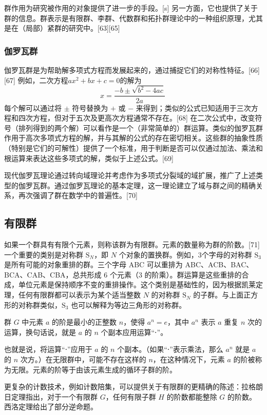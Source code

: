 群作用为研究被作用的对象提供了进一步的手段。[s] 另一方面，它也提供了关于群的信息。群表示是有限群、李群、代数群和拓扑群理论中的一种组织原理，尤其是在（局部）紧群的研究中。[63][65]
\subsubsection{伽罗瓦群}   
伽罗瓦群是为帮助解多项式方程而发展起来的，通过捕捉它们的对称性特征。[66][67] 例如，二次方程\(ax^2 + bx + c = 0\)的解为  
\[x = \frac{-b \pm \sqrt{b^2 - 4ac}}{2a}~\]
每个解可以通过将 \( \pm \) 符号替换为 \( + \) 或 \( - \) 来得到；类似的公式已知适用于三次方程和四次方程，但对于五次及更高次方程通常不存在。[68] 在二次公式中，改变符号（排列得到的两个解）可以看作是一个（非常简单的）群运算。类似的伽罗瓦群作用于高次多项式方程的解，并与其解的公式的存在密切相关。这些群的抽象性质（特别是它们的可解性）提供了一个标准，用于判断是否可以仅通过加法、乘法和根运算来表达这些多项式的解，类似于上述公式。[69]

现代伽罗瓦理论通过转向域理论并考虑作为多项式分裂域的域扩展，推广了上述类型的伽罗瓦群。通过伽罗瓦理论的基本定理，这一理论建立了域与群之间的精确关系，再次强调了群在数学中的普遍性。[70]
\subsection{有限群}  
如果一个群具有有限个元素，则称该群为有限群。元素的数量称为群的阶数。[71] 一个重要的类别是对称群 \(\mathrm{S}_N\)，即 \(N\) 个对象的置换群。例如，3个字母的对称群 \(\mathrm{S}_3\) 是所有可能的对象重排的群。三个字母 ABC 可以重排为 ABC、ACB、BAC、BCA、CAB、CBA，总共形成 6 个元素（3 的阶乘）。群运算是这些重排的合成，单位元素是保持顺序不变的重排操作。这个类别是基础性的，因为根据凯莱定理，任何有限群都可以表示为某个适当整数 \(N\) 的对称群 \(\mathrm{S}_N\) 的子群。与上面正方形的对称群类似，\(\mathrm{S}_3\) 也可以解释为等边三角形的对称群。

群 \(G\) 中元素 \(a\) 的阶是最小的正整数 \(n\)，使得 \(a^n = e\)，其中 \(a^n\) 表示 \(a\) 重复 \(n\) 次的运算，换句话说，就是 \(a\) 的 \(n\) 个副本应用运算“⋅”。

也就是说，将运算“⋅”应用于 \(a\) 的 \(n\) 个副本。（如果“⋅”表示乘法，那么 \(a^n\) 就是 \(a\) 的 \(n\) 次方。）在无限群中，可能不存在这样的 \(n\)，在这种情况下，元素 \(a\) 的阶被称为无限。元素的阶等于由该元素生成的循环子群的阶。

更复杂的计数技术，例如计数陪集，可以提供关于有限群的更精确的陈述：拉格朗日定理指出，对于一个有限群 \(G\)，任何有限子群 \(H\) 的阶数都能整除 \(G\) 的阶数。西洛定理给出了部分逆命题。

